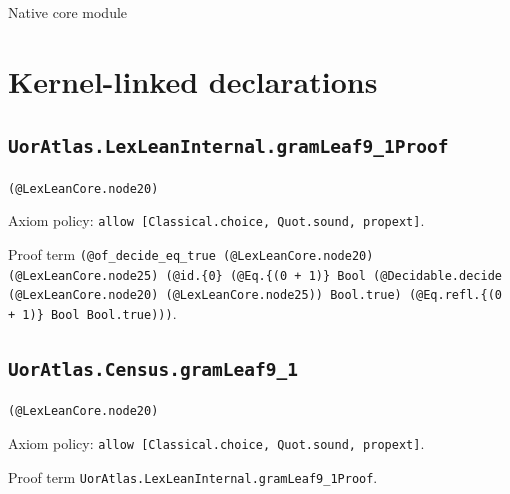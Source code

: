 \documentclass[11pt]{article}
\begin{document}
\begin{center}{\LARGE Native core module}\end{center}
\section*{Kernel-linked declarations}
\subsection*{\texttt{UorAtlas.LexLeanInternal.gramLeaf9\_1Proof}}
\noindent\texttt{(@LexLeanCore.node20)}\par
\noindent Axiom policy: \texttt{allow [Classical.choice, Quot.sound, propext]}.\par
\noindent Proof term \texttt{(@of\_decide\_eq\_true (@LexLeanCore.node20) (@LexLeanCore.node25) (@id.\{0\} (@Eq.\{(0 + 1)\} Bool (@Decidable.decide (@LexLeanCore.node20) (@LexLeanCore.node25)) Bool.true) (@Eq.refl.\{(0 + 1)\} Bool Bool.true)))}.\par
\subsection*{\texttt{UorAtlas.Census.gramLeaf9\_1}}
\noindent\texttt{(@LexLeanCore.node20)}\par
\noindent Axiom policy: \texttt{allow [Classical.choice, Quot.sound, propext]}.\par
\noindent Proof term \texttt{UorAtlas.LexLeanInternal.gramLeaf9\_1Proof}.\par
\end{document}
